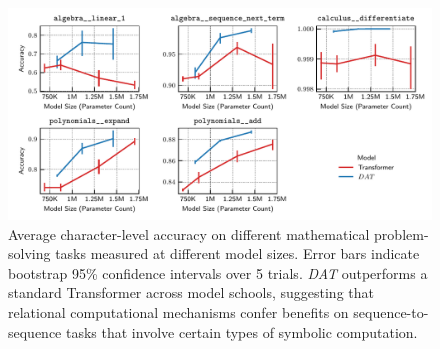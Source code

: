 

\begin{figure}
    \includegraphics[width=\textwidth]{figs/experiments/math/math_accuracy_scaling.pdf}
    \caption{Average character-level accuracy on different mathematical problem-solving tasks measured at different model sizes. Error bars indicate bootstrap 95\% confidence intervals over 5 trials. \textit{DAT} outperforms a standard Transformer across model schools, suggesting that relational computational mechanisms confer benefits on sequence-to-sequence tasks that involve certain types of symbolic computation.}\label{fig:math_scaling}
\end{figure}

%     


